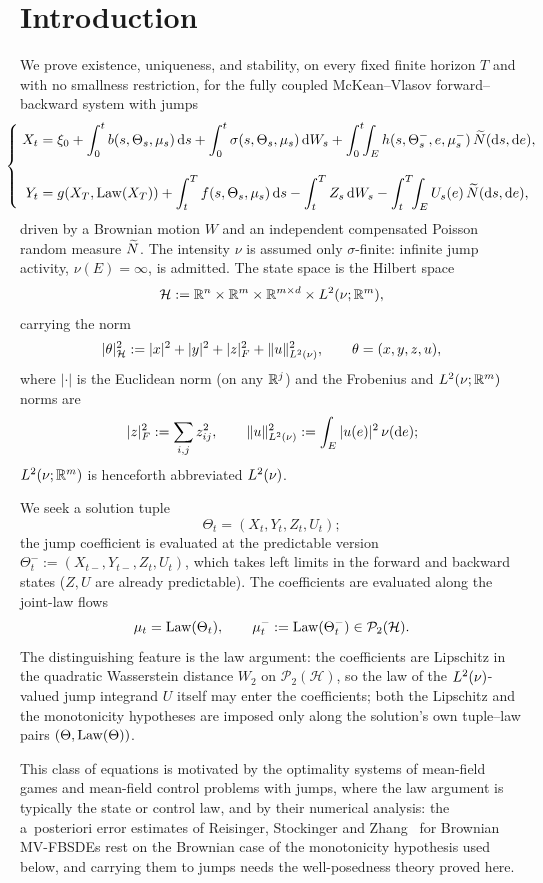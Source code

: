 \section{Introduction}

We prove existence, uniqueness, and stability, on every fixed finite horizon $T$ and
with no smallness restriction, for the fully coupled
McKean--Vlasov forward--backward system with jumps
\begin{equation}\label{eq:mvfbsdej}
\PaperSystemBox{\left\{\;\begin{aligned}
X_t&=\xi_0+\int_0^t b(s,\Theta_s,\mu_s)\,\diff s+\int_0^t\sigma(s,\Theta_s,\mu_s)\,\diff W_s
  +\int_0^t\!\!\int_E h(s,\Theta_{s}^-,e,\mu_s^-)\,\Nt(\diff s,\diff e),\\[9pt]
Y_t&=g(X_T,\Law(X_T))+\int_t^T f(s,\Theta_s,\mu_s)\,\diff s
  -\int_t^T Z_s\,\diff W_s-\int_t^T\!\!\int_E U_s(e)\,\Nt(\diff s,\diff e),
\end{aligned}\right.}
\end{equation}
driven by a Brownian motion $W$ and an independent compensated Poisson random measure
$\widetilde{N}$. The intensity $\nu$ is assumed only $\sigma$-finite: infinite jump
activity, $\nu(E)=\infty$, is admitted. The state space is the
Hilbert space
\[
\mathcal H:=\mathbb{R}^n\times\mathbb{R}^m\times\mathbb{R}^{m\times d}\times L^2(\nu;\mathbb{R}^m),
\]
carrying the norm
\[
|\theta|_{\mathcal H}^2:=|x|^2+|y|^2+|z|_F^2+\lVert u\rVert_{L^2(\nu)}^2,\qquad \theta=(x,y,z,u),
\]
where $|\cdot|$ is the Euclidean norm (on any $\mathbb{R}^j$) and the Frobenius and
$L^2(\nu;\mathbb{R}^m)$ norms are
\[
|z|_F^2:=\sum_{i,j}z_{ij}^2,
\qquad
\lVert u\rVert_{L^2(\nu)}^2:=\int_E|u(e)|^2\,\nu(\mathrm{d} e);
\]
$L^2(\nu;\mathbb{R}^m)$ is henceforth abbreviated $L^2(\nu)$.

We seek a solution tuple
\[
\Theta_t=(X_t,Y_t,Z_t,U_t);
\]
the jump coefficient is evaluated at the predictable version
$\Theta_t^-:=(X_{t-},Y_{t-},Z_t,U_t)$, which takes left limits in the forward and backward
states ($Z,U$ are already predictable). The coefficients are evaluated along the joint-law flows
\[
\mu_t=\mathrm{Law}(\Theta_t),\qquad \mu_t^-:=\mathrm{Law}(\Theta_t^-)\in\mathcal P_2(\mathcal H).
\]
The distinguishing feature is the law argument:
the coefficients are Lipschitz in the quadratic Wasserstein distance $W_2$
on $\mathcal P_2(\mathcal H)$, so the law of the $L^2(\nu)$-valued jump integrand $U$ itself
may enter the coefficients; both the Lipschitz and the monotonicity hypotheses are
imposed only along the solution's own tuple--law pairs $(\Theta,\mathrm{Law}(\Theta))$.

This class
of equations is motivated by the optimality systems of mean-field games and mean-field
control problems with jumps, where the law argument is typically the state or control law,
and by their numerical analysis: the a~posteriori error estimates of Reisinger, Stockinger
and Zhang~\cite{RSZ} for Brownian MV-FBSDEs rest on the Brownian case of the monotonicity
hypothesis used below, and carrying them to jumps needs the well-posedness theory proved
here.

